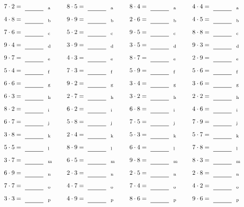 \documentclass
[
  draft    = true,
  fontsize = 11pt,
  parskip  = half-
]
{scrartcl}
\begin{document}
\par\vfill\par
\begin{align*}
    \pline{7\cdot2}&=\rline{a}
  & \pline{8\cdot5}&=\rline{a}
  & \pline{8\cdot4}&=\rline{a}
  & \pline{4\cdot4}&=\rline{a} \\[1ex]
    \pline{4\cdot8}&=\rline{b}
  & \pline{9\cdot9}&=\rline{b}
  & \pline{2\cdot6}&=\rline{b}
  & \pline{4\cdot5}&=\rline{b} \\[1ex]
    \pline{7\cdot6}&=\rline{c}
  & \pline{5\cdot2}&=\rline{c}
  & \pline{9\cdot5}&=\rline{c}
  & \pline{8\cdot8}&=\rline{c} \\[1ex]
    \pline{9\cdot4}&=\rline{d}
  & \pline{3\cdot9}&=\rline{d}
  & \pline{3\cdot5}&=\rline{d}
  & \pline{9\cdot3}&=\rline{d} \\[1ex]
    \pline{9\cdot7}&=\rline{e}
  & \pline{4\cdot3}&=\rline{e}
  & \pline{8\cdot7}&=\rline{e}
  & \pline{2\cdot9}&=\rline{e} \\[1ex]
    \pline{5\cdot4}&=\rline{f}
  & \pline{7\cdot3}&=\rline{f}
  & \pline{5\cdot9}&=\rline{f}
  & \pline{5\cdot6}&=\rline{f} \\[1ex]
    \pline{6\cdot6}&=\rline{g}
  & \pline{9\cdot2}&=\rline{g}
  & \pline{3\cdot4}&=\rline{g}
  & \pline{3\cdot6}&=\rline{g} \\[1ex]
    \pline{6\cdot3}&=\rline{h}
  & \pline{2\cdot7}&=\rline{h}
  & \pline{3\cdot2}&=\rline{h}
  & \pline{2\cdot2}&=\rline{h} \\[1ex]
    \pline{8\cdot2}&=\rline{i}
  & \pline{6\cdot2}&=\rline{i}
  & \pline{6\cdot8}&=\rline{i}
  & \pline{4\cdot6}&=\rline{i} \\[1ex]
    \pline{6\cdot7}&=\rline{j}
  & \pline{5\cdot8}&=\rline{j}
  & \pline{7\cdot5}&=\rline{j}
  & \pline{7\cdot9}&=\rline{j} \\[1ex]
    \pline{3\cdot8}&=\rline{k}
  & \pline{2\cdot4}&=\rline{k}
  & \pline{5\cdot3}&=\rline{k}
  & \pline{5\cdot7}&=\rline{k} \\[1ex]
    \pline{5\cdot5}&=\rline{l}
  & \pline{8\cdot9}&=\rline{l}
  & \pline{6\cdot4}&=\rline{l}
  & \pline{7\cdot8}&=\rline{l} \\[1ex]
    \pline{3\cdot7}&=\rline{m}
  & \pline{6\cdot5}&=\rline{m}
  & \pline{9\cdot8}&=\rline{m}
  & \pline{8\cdot3}&=\rline{m} \\[1ex]
    \pline{6\cdot9}&=\rline{n}
  & \pline{2\cdot3}&=\rline{n}
  & \pline{2\cdot5}&=\rline{n}
  & \pline{2\cdot8}&=\rline{n} \\[1ex]
    \pline{7\cdot7}&=\rline{o}
  & \pline{4\cdot7}&=\rline{o}
  & \pline{7\cdot4}&=\rline{o}
  & \pline{4\cdot2}&=\rline{o} \\[1ex]
    \pline{3\cdot3}&=\rline{p}
  & \pline{4\cdot9}&=\rline{p}
  & \pline{8\cdot6}&=\rline{p}
  & \pline{9\cdot6}&=\rline{p}
\end{align*}
\end{document}
